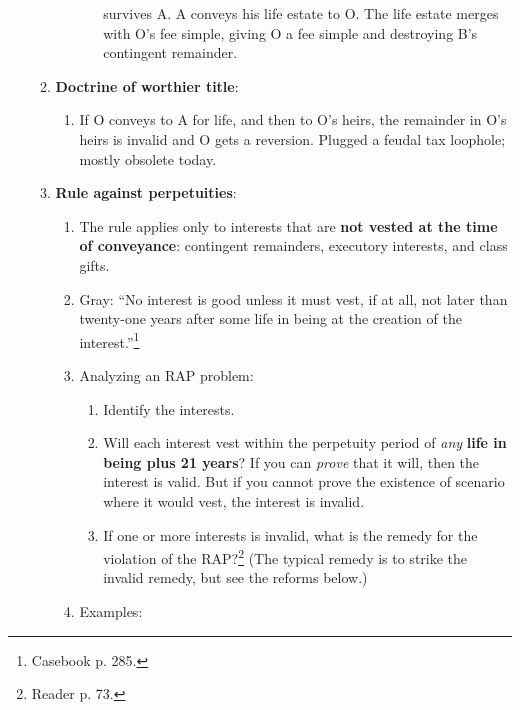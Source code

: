 \begin{enumerate}
\begin{enumerate}
\begin{enumerate}
\begin{enumerate}
                survives A.  A conveys his life estate to O. The life estate 
                merges with O's fee simple, giving O a fee simple and 
                destroying B's contingent remainder.
            \end{enumerate}
        \end{enumerate}
        \item \textbf{Doctrine of worthier title}:
        \begin{enumerate}
            \item If O conveys to A for life, and then to O's heirs, the 
            remainder in O's heirs is invalid and O gets a reversion. Plugged 
            a feudal tax loophole; mostly obsolete today.
        \end{enumerate}
        \item \textbf{Rule against perpetuities}:
        \begin{enumerate}
            \item The rule applies only to interests that are \textbf{not 
            vested at the time of conveyance}: contingent remainders, 
            executory interests, and class gifts.
            \item Gray: ``No interest is good unless it must vest, if at all, 
            not later than twenty-one years after some life in being at the 
            creation of the interest.''\footnote{Casebook p. 285.}
            \item Analyzing an RAP problem:
            \begin{enumerate}
                \item Identify the interests.
                \item Will each interest vest within the perpetuity period of 
                \emph{any} \textbf{life in being plus 21 years}? If you can 
                \emph{prove} that it will, then the interest is valid. But if 
                you cannot prove the existence of scenario where it would 
                vest, the interest is invalid.
                \item If one or more interests is invalid, what is the remedy 
                for the violation of the RAP?\footnote{Reader p. 73.} (The 
                typical remedy is to strike the invalid remedy, but see the 
                reforms below.)
            \end{enumerate}
            \item Examples:
            \begin{enumerate}

\end{enumerate}
\end{enumerate}
\end{enumerate}
\end{enumerate}
